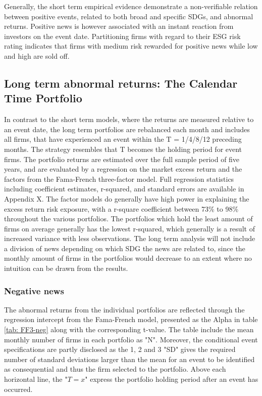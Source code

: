 Generally, the short term empirical evidence demonstrate a non-verifiable relation between positive events, related to both broad and specific SDGs, and abnormal returns. Positive news is however associated with an instant reaction from investors on the event date. Partitioning firms with regard to their ESG risk rating indicates that firms with medium risk rewarded for positive news while low and high are sold off.     









\subsection{Long term abnormal returns: The Calendar Time Portfolio} \label{sec: long_term_portfolio}

In contrast to the short term models, where the returns are measured relative to an event date, the long term portfolios are rebalanced each month and includes all firms, that have experienced an event within the T = 1/4/8/12 preceding months. The strategy resembles that T becomes the holding period for event firms. The portfolio returns are estimated over the full sample period of five years, and are evaluated by a regression on the market excess return and the factors from the Fama-French \citeyear{Fama_french_3fac} three-factor model. Full regression statistics including coefficient estimates, r-squared, and standard errors are available in Appendix X. The factor models do generally have high power in explaining the excess return risk exposure, with a r-square coefficient between 73\% to 98\% throughout the various portfolios. The portfolios which hold the least amount of firms on average generally has the lowest r-squared, which generally is a result of increased variance with less observations. The long term analysis will not include a division of news depending on which SDG the news are related to, since the monthly amount of firms in the portfolios would decrease to an extent where no intuition can be drawn from the results.   


\subsubsection{Negative news}

The abnormal returns from the individual portfolios are reflected through the regression intercept from the Fama-French model, presented as the Alpha in table \ref{tab: FF3-neg} along with the corresponding t-value. The table include the mean monthly number of firms in each portfolio as "N". Moreover, the conditional event specifications are partly disclosed as the 1, 2 and 3 "SD" gives the required number of standard deviations larger than the mean for an event to be identified as consequential and thus the firm selected to the portfolio. Above each horizontal line, the "$T = x$" express the portfolio holding period after an event has occurred. 

